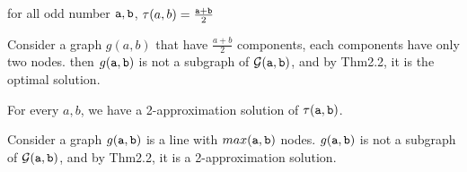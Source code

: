 \begin{corollary}
for all odd number $\mathtt{a},\mathtt{b}$, $\tau(a,b)=\frac{\mathtt{a}+\mathtt{b}}{2}$
\end{corollary}

Consider a graph  $g(a,b)$ that have  $\frac{a+b}{2}$ components, each components have only two nodes. then  $g(\mathtt{a},\mathtt{b})$ is not a subgraph of  ${\cal G}(\mathtt{a},\mathtt{b})$, and by Thm2.2, it is the optimal solution.

\begin{theorem} 
For every $a,b$, we have a 2-approximation solution of  $\tau(\mathtt{a},\mathtt{b})$.
\end{theorem}
Consider a graph  $g(\mathtt{a},\mathtt{b})$ is a line with $max(\mathtt{a},\mathtt{b})$ nodes.  $g(\mathtt{a},\mathtt{b})$ is not a subgraph of  ${\cal G}(\mathtt{a},\mathtt{b})$, and by Thm2.2, it is a 2-approximation solution.
